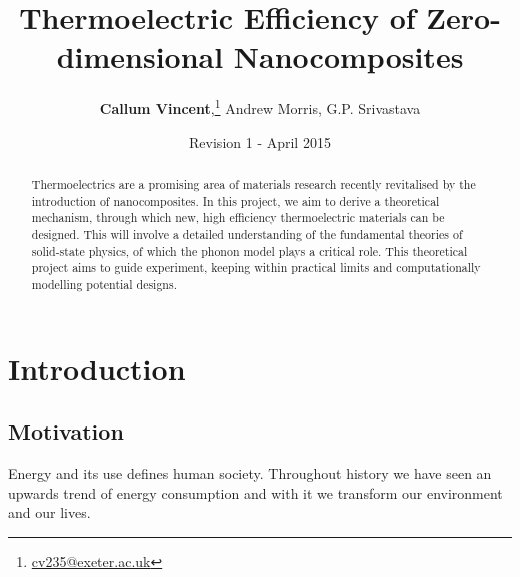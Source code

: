 \documentclass[12pt,draft]{article}
\begin{document}

\pagestyle{empty}

\title{\textbf{Thermoelectric Efficiency of Zero-dimensional Nanocomposites}}
\author{\textbf{Callum Vincent},\thanks{\href{mailto:cv235@exeter.ac.uk}{cv235@exeter.ac.uk}}
Andrew Morris,
G.P. Srivastava}
\date{Revision 1 - April 2015}
\maketitle

\begin{abstract}
Thermoelectrics are a promising area of materials research recently revitalised by the introduction of nanocomposites. In this project, we aim to derive a theoretical mechanism, through which new, high efficiency thermoelectric materials can be designed. This will involve a detailed understanding of the fundamental theories of solid-state physics, of which the phonon model plays a critical role. This theoretical project aims to guide experiment, keeping within practical limits and computationally modelling potential designs.
\vfill
\end{abstract}

\thispagestyle{empty}
\pagebreak

\tableofcontents
\pagebreak




\pagestyle{fancy}

\section[Intro]{Introduction}
 
\subsection{Motivation}
Energy and its use defines human society. Throughout history we have seen an upwards trend of energy consumption and with it we transform our environment and our lives.
\end{document}
